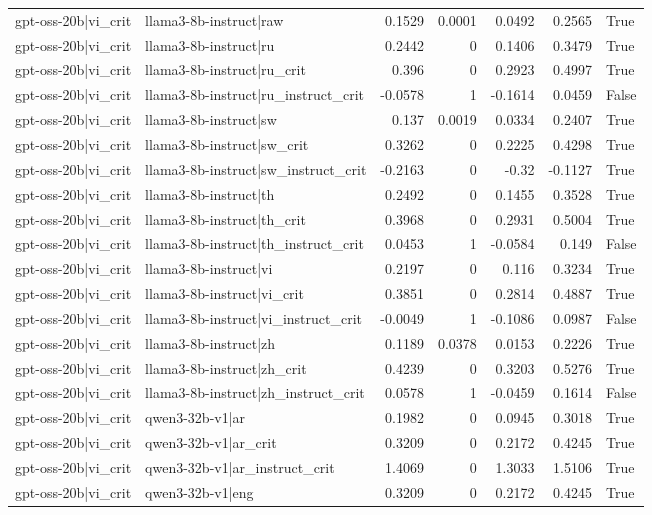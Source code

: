 \begin{table}
\begin{tabular}{l l r r r r l}
gpt-oss-20b|vi_crit & llama3-8b-instruct|raw & 0.1529 & 0.0001 & 0.0492 & 0.2565 & True \\
gpt-oss-20b|vi_crit & llama3-8b-instruct|ru & 0.2442 & 0 & 0.1406 & 0.3479 & True \\
gpt-oss-20b|vi_crit & llama3-8b-instruct|ru_crit & 0.396 & 0 & 0.2923 & 0.4997 & True \\
gpt-oss-20b|vi_crit & llama3-8b-instruct|ru_instruct_crit & -0.0578 & 1 & -0.1614 & 0.0459 & False \\
gpt-oss-20b|vi_crit & llama3-8b-instruct|sw & 0.137 & 0.0019 & 0.0334 & 0.2407 & True \\
gpt-oss-20b|vi_crit & llama3-8b-instruct|sw_crit & 0.3262 & 0 & 0.2225 & 0.4298 & True \\
gpt-oss-20b|vi_crit & llama3-8b-instruct|sw_instruct_crit & -0.2163 & 0 & -0.32 & -0.1127 & True \\
gpt-oss-20b|vi_crit & llama3-8b-instruct|th & 0.2492 & 0 & 0.1455 & 0.3528 & True \\
gpt-oss-20b|vi_crit & llama3-8b-instruct|th_crit & 0.3968 & 0 & 0.2931 & 0.5004 & True \\
gpt-oss-20b|vi_crit & llama3-8b-instruct|th_instruct_crit & 0.0453 & 1 & -0.0584 & 0.149 & False \\
gpt-oss-20b|vi_crit & llama3-8b-instruct|vi & 0.2197 & 0 & 0.116 & 0.3234 & True \\
gpt-oss-20b|vi_crit & llama3-8b-instruct|vi_crit & 0.3851 & 0 & 0.2814 & 0.4887 & True \\
gpt-oss-20b|vi_crit & llama3-8b-instruct|vi_instruct_crit & -0.0049 & 1 & -0.1086 & 0.0987 & False \\
gpt-oss-20b|vi_crit & llama3-8b-instruct|zh & 0.1189 & 0.0378 & 0.0153 & 0.2226 & True \\
gpt-oss-20b|vi_crit & llama3-8b-instruct|zh_crit & 0.4239 & 0 & 0.3203 & 0.5276 & True \\
gpt-oss-20b|vi_crit & llama3-8b-instruct|zh_instruct_crit & 0.0578 & 1 & -0.0459 & 0.1614 & False \\
gpt-oss-20b|vi_crit & qwen3-32b-v1|ar & 0.1982 & 0 & 0.0945 & 0.3018 & True \\
gpt-oss-20b|vi_crit & qwen3-32b-v1|ar_crit & 0.3209 & 0 & 0.2172 & 0.4245 & True \\
gpt-oss-20b|vi_crit & qwen3-32b-v1|ar_instruct_crit & 1.4069 & 0 & 1.3033 & 1.5106 & True \\
gpt-oss-20b|vi_crit & qwen3-32b-v1|eng & 0.3209 & 0 & 0.2172 & 0.4245 & True \\

\end{tabular}
\end{table}

